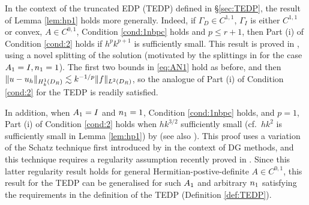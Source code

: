 In the context of the truncated EDP (TEDP) defined in \S\ref{sec:TEDP}, the result of Lemma \ref{lem:hp1} holds more generally. Indeed,
if $\Gamma_D\in C^{1,1}$, $\Gamma_I$ is either $C^{1,1}$ or convex, $A\in C^{0,1}$, Condition \ref{cond:1nbpc} holds and $p\leq r+1$, then Part (i) of Condition \ref{cond:2} holds
if $h^p k^{p+1}$ is sufficiently small. This result is proved 
in \cite{ChNi:18a}, using a novel splitting of the solution (motivated by the splittings in \cite{MeSa:10, MeSa:11} for the case $A_{1}= I, n_{1}=1$). The first two bounds in \eqref{eq:AN1} hold as before, and then 
$\|u-u_h\|_{\HokDR} \lesssim  k^{-1/p}\|f\|_{\LtDR}$, so the analogue of Part (i) of Condition \ref{cond:2} for the TEDP is readily satisfied.

In addition, when $A_{1}=I$ and $n_{1}=1$, Condition \ref{cond:1nbpc} holds, and $p=1$,  Part (i) of Condition \ref{cond:2} holds when $hk^{3/2}$ sufficiently small (cf.~$hk^2$ is sufficiently small in Lemma \ref{lem:hp1}) by 
\cite{ZhWu:13} (see also \cite{ChNi:18}). This proof uses 
a variation of the Schatz technique first introduced by \cite{FeWu:11} in the context of DG methods, and this technique requires a regularity assumption recently proved in \cite{ChNiTo:18}. Since this latter regularity result holds for general Hermitian-postive-definite $A\in C^{0,1}$, this result for the TEDP can be generalised for such $A_{1}$ and arbitrary $n_{1}$ satisfying the requirements in the definition of the TEDP (Definition \ref{def:TEDP}).
\ere


